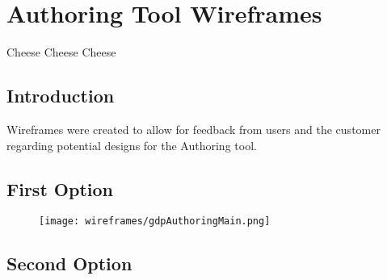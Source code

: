 \chapter{Authoring Tool Wireframes} \label{Chapter:Authoring Tool Wireframes}

\begin{preamble}
	Cheese Cheese Cheese
\end{preamble}

\section{Introduction}

Wireframes were created to allow for feedback from users and the customer regarding potential designs for the Authoring tool.


\section{First Option} 

\begin{figure}
	\texttt{[image: wireframes/gdpAuthoringMain.png]}
	\caption{}
	\label{Figure:wireframes/authoringtool/main}
\end{figure}

\section{Second Option} 